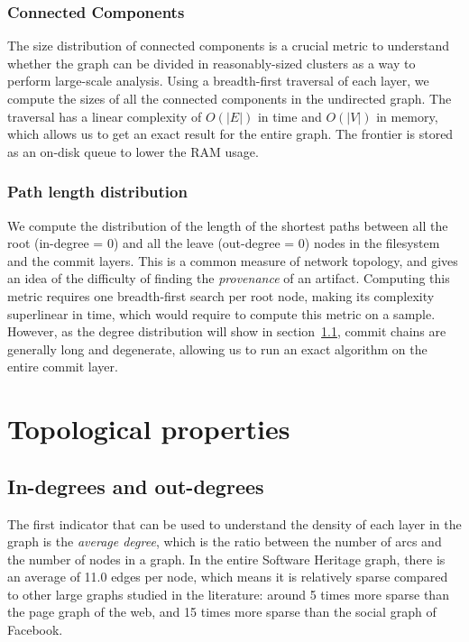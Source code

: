 \subsubsection{Connected Components}
The size distribution of connected components is a crucial metric to understand
whether the graph can be divided in reasonably-sized clusters as a way to
perform large-scale analysis.
Using a breadth-first traversal of each layer, we compute the sizes of all the
connected components in the undirected graph. The traversal has a linear
complexity of $O(|E|)$ in time and $O(|V|)$ in memory, which
allows us to get an exact result for the entire graph. The frontier is stored
as an on-disk queue to lower the RAM usage.

\subsubsection{Path length distribution}%
\label{sec:metho:shortestpath}

We compute the distribution of the length of the shortest paths between all the
root (in-degree = 0) and all the leave (out-degree = 0) nodes in the filesystem
and the commit layers. This is a common measure of network topology, and gives
an idea of the difficulty of finding the \emph{provenance} of an artifact.
Computing this metric requires one breadth-first search per root node, making
its complexity superlinear in time, which would require to compute this metric
on a sample. However, as the degree distribution will show in
section~\cref{sec:topo:degrees},
commit chains are generally long and degenerate, allowing us to run an exact
algorithm on the entire commit layer.


\section{Topological properties}%
\label{sec:topology-results}

\subsection{In-degrees and out-degrees}%
\label{sec:topo:degrees}

The first indicator that can be used to understand the density of each layer in
the graph is the \emph{average degree}, which is the ratio between the number
of arcs and the number of nodes in a graph.
In the entire Software Heritage graph, there is an average of 11.0 edges per
node, which means it is relatively sparse compared to other large graphs
studied in the literature: around 5 times more sparse than the page graph of the
web, and 15 times more sparse than the social graph of Facebook.

